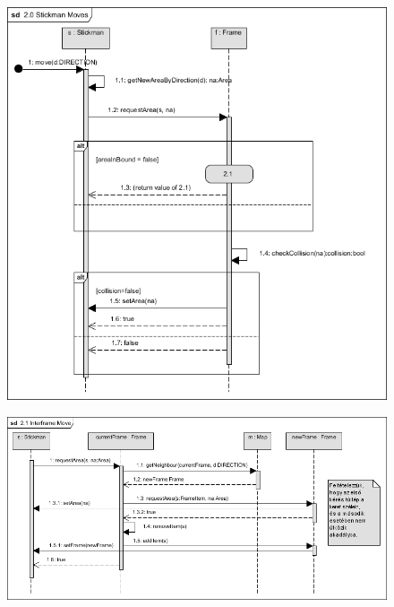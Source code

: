 		\begin{figure}[h!]
			\begin{center}
				\includegraphics[scale=0.8]{resources/seq_2-0_stickmanMoves.png}
				\caption{}
			\end{center}
		\end{figure}
		
		\begin{figure}[h!]
			\begin{center}
				\includegraphics[scale=0.8]{resources/seq_2-1_interframeMove.png}
				\caption{}
			\end{center}
		\end{figure}
		
